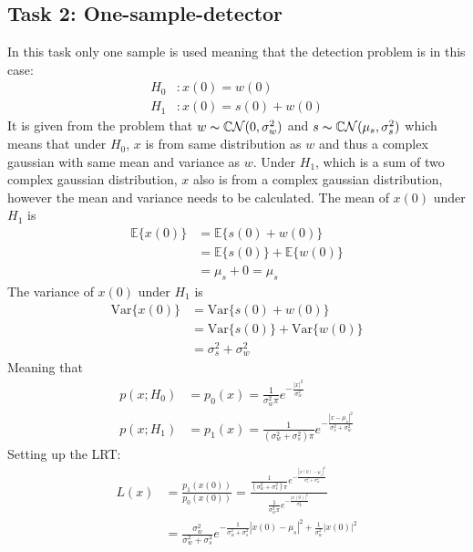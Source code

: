 \subsection{Task 2: One-sample-detector}
In this task only one sample is used meaning that the detection problem is in this case:
\begin{align}
    H_0 &: x(0) = w(0)\nonumber\\
    H_1 &: x(0) = s(0)+w(0)\nonumber
\end{align}
It is given from the problem that $w\thicksim\mathbb{C}\mathcal{N}(0, \sigma_w^2)$ and $s\thicksim\mathbb{C}\mathcal{N}(\mu_s, \sigma_s^2)$ which means that under $H_0$, $x$ is from same distribution as $w$ and thus a complex gaussian with same mean and variance as $w$. Under $H_1$, which is a sum of two complex gaussian distribution, $x$ also is from a complex gaussian distribution, however the mean and variance needs to be calculated.
The mean of $x(0)$ under $H_1$ is
\begin{align}
    \mathbb{E}\{x(0)\} & = \mathbb{E}\{s(0)+w(0)\}\nonumber\\
    & = \mathbb{E}\{s(0)\} + \mathbb{E}\{w(0)\}\nonumber\\
    & = \mu_s + 0 = \mu_s\nonumber
\end{align} 
The variance of $x(0)$ under $H_1$ is
\begin{align}
    \mathrm{Var}\{x(0)\} & = \mathrm{Var}\{s(0)+w(0)\}\nonumber\\
    & = \mathrm{Var}\{s(0)\} + \mathrm{Var}\{w(0)\}\nonumber\\
    & = \sigma_s^2+\sigma_w^2\nonumber
\end{align}
Meaning that
\begin{align}
    p(x;H_0) & = p_0(x) = \frac{1}{\sigma_w^2\pi}e^{-\frac{|x|^2}{\sigma_w^2}}\\
    p(x;H_1) & = p_1(x) = \frac{1}{(\sigma_w^2+\sigma_s^2)\pi}e^{-\frac{|x-\mu_s|^2}{\sigma_s^2+\sigma_w^2}}
\end{align}
Setting up the LRT:
\begin{align}
    L(x) & = \frac{p_1(x(0))}{p_0(x(0))} = \frac{\frac{1}{(\sigma_w^2+\sigma_s^2)\pi}e^{-\frac{|x(0)-\mu_s|^2}{\sigma_s^2+\sigma_w^2}}}{\frac{1}{\sigma_w^2\pi}e^{-\frac{|x(0)|^2}{\sigma_w^2}}}\nonumber\\
    & = \frac{\sigma_w^2}{\sigma_w^2+\sigma_s^2}e^{-\frac{1}{\sigma_w^2+\sigma_s^2}|x(0)-\mu_s|^2+\frac{1}{\sigma_w^2}|x(0)|^2}\nonumber
\end{align}
